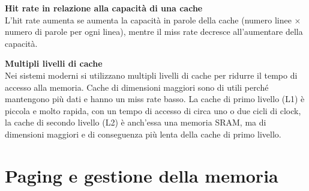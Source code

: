 \begin{defn}
    \textbf{Hit rate in relazione alla capacità di una cache} \\
    L'hit rate aumenta se aumenta la capacità in parole della cache (numero
    linee $\times$ numero di parole per ogni linea), mentre il miss rate
    decresce all'aumentare della capacità.
\end{defn}

\begin{defn}
    \textbf{Multipli livelli di cache} \\
    Nei sistemi moderni si utilizzano multipli livelli di cache per ridurre il
    tempo di accesso alla memoria. Cache di dimensioni maggiori sono di utili
    perché mantengono più dati e hanno un miss rate basso. La cache di primo
    livello (L1) è piccola e molto rapida, con un tempo di accesso di circa uno
    o due cicli di clock, la cache di secondo livello (L2) è anch'essa una
    memoria SRAM, ma di dimensioni maggiori e di conseguenza più lenta della
    cache di primo livello.

\end{defn}




\section{Paging e gestione della memoria}

